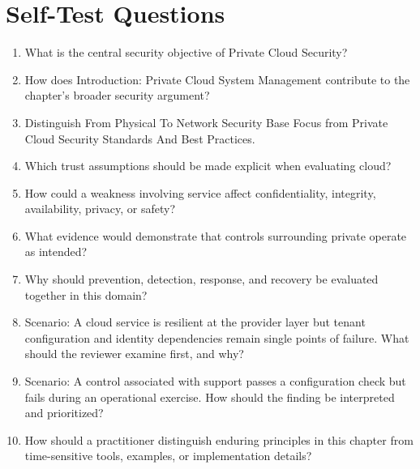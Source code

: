 \documentclass[11pt]{article}
\begin{document}
\section*{Self-Test Questions}
\begin{enumerate}
\item What is the central security objective of Private Cloud Security?
\item How does Introduction: Private Cloud System Management contribute to the chapter's broader security argument?
\item Distinguish From Physical To Network Security Base Focus from Private Cloud Security Standards And Best Practices.
\item Which trust assumptions should be made explicit when evaluating cloud?
\item How could a weakness involving service affect confidentiality, integrity, availability, privacy, or safety?
\item What evidence would demonstrate that controls surrounding private operate as intended?
\item Why should prevention, detection, response, and recovery be evaluated together in this domain?
\item Scenario: A cloud service is resilient at the provider layer but tenant configuration and identity dependencies remain single points of failure. What should the reviewer examine first, and why?
\item Scenario: A control associated with support passes a configuration check but fails during an operational exercise. How should the finding be interpreted and prioritized?
\item How should a practitioner distinguish enduring principles in this chapter from time-sensitive tools, examples, or implementation details?
\end{enumerate}
\end{document}
